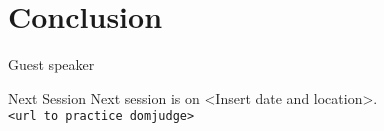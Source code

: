 \documentclass[11pt,pdf, aspectratio=169]{beamer}
\begin{document}
  \section{Conclusion}
  \begin{frame}{Guest speaker}
  \end{frame}
  \begin{frame}{Next Session}
    Next session is on <Insert date and location>.\\

    \texttt{<url to practice domjudge>}
  \end{frame}
\end{document}

